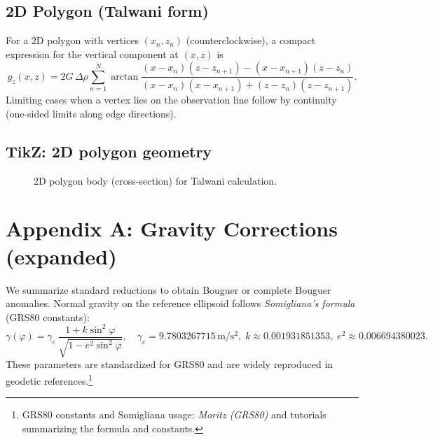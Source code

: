 \documentclass[11pt,a4paper]{article}
\begin{document}
\subsection{2D Polygon (Talwani form)}
For a 2D polygon with vertices $(x_n,z_n)$ (counterclockwise), a compact expression for the vertical component at $(x,z)$ is
\begin{equation}
  g_z(x,z) = 2G\,\Delta\rho\sum_{n=1}^{N} \arctan\!\frac{(x-x_n)(z-z_{n+1})-(x-x_{n+1})(z-z_n)}{(x-x_n)(x-x_{n+1})+(z-z_n)(z-z_{n+1})}.
\end{equation}
Limiting cases when a vertex lies on the observation line follow by continuity (one-sided limits along edge directions).

\subsection*{TikZ: 2D polygon geometry}
\begin{figure}[h]
\centering
{}
\caption{2D polygon body (cross-section) for Talwani calculation.}
\end{figure}

\section{Appendix A: Gravity Corrections (expanded)}\label{app:corr}
We summarize standard reductions to obtain Bouguer or complete Bouguer anomalies. Normal gravity on the reference ellipsoid follows \emph{Somigliana's formula} (GRS80 constants):
\begin{equation}
  \gamma(\varphi)=\gamma_e\,\frac{1+k\sin^2\varphi}{\sqrt{1-e^2\sin^2\varphi}},\quad \gamma_e=9.7803267715\,\mathrm{m/s^2},\; k\approx0.001931851353,\; e^2\approx0.006694380023.
\end{equation}
These parameters are standardized for GRS80 and are widely reproduced in geodetic references.\footnote{GRS80 constants and Somigliana usage: \emph{Moritz (GRS80)} and tutorials summarizing the formula and constants.}
\end{document}
